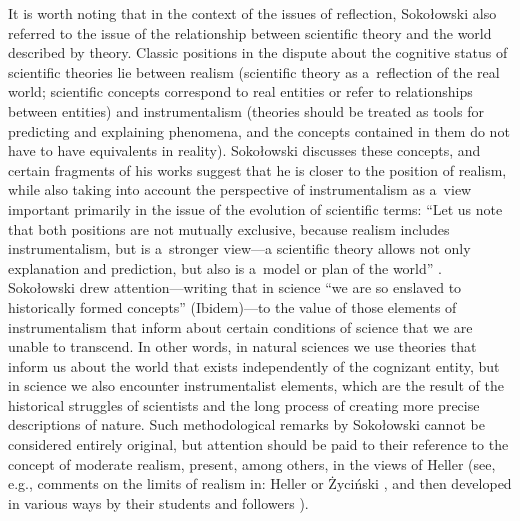 \documentclass[%
  manuscript=article,
  year=2024,
  volume=77,
  doi=00000.000,
]{zfn}
\begin{document}
It is worth noting that in the context of the issues of reflection, Sokołowski also referred to the issue of the relationship between scientific theory and the world described by theory. Classic positions in the dispute about the cognitive status of scientific theories lie between realism (scientific theory as a~reflection of the real world; scientific concepts correspond to real entities or refer to relationships between entities) and instrumentalism (theories should be treated as tools for predicting and explaining phenomena, and the concepts contained in them do not have to have equivalents in reality). Sokołowski discusses these concepts, and certain fragments of his works suggest that he is closer to the position of realism, while also taking into account the perspective of instrumentalism as a~view important primarily in the issue of the evolution of scientific terms: ``Let us note that both positions are not mutually exclusive, because realism includes instrumentalism, but is a~stronger view---a scientific theory allows not only explanation and prediction, but also is a~model or plan of the world''
\parencite[][]{Sokoowski1986Pluralizm}. %
 Sokołowski drew attention---writing that in science ``we are so enslaved to historically formed concepts''
 (Ibidem)---to the value of those elements of instrumentalism that inform about certain conditions of science that we are unable to transcend. In other words, in natural sciences we use theories that inform us about the world that exists independently of the cognizant entity, but in science we also encounter instrumentalist elements, which are the result of the historical struggles of scientists and the long process of creating more precise descriptions of nature. Such methodological remarks by Sokołowski cannot be considered entirely original, but attention should be paid to their reference to the concept of moderate realism, present, among others, in the views of Heller (see, e.g., comments on the limits of realism in: Heller 
\parencite*[][pp.80–81]{Heller1992AFilozofia} %
 or Życiński 
\parencite*[e.g.,][]{Zycinski1993Granice}, %
 and then developed in various ways by their students and followers 
\parencites[e.g.,][]{Sierotowicz1997Realizm}[][]{Rodzen2005Czy}%
).
\end{document}
